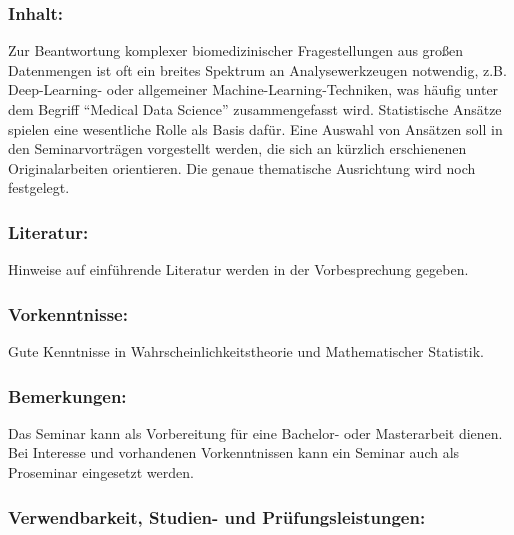 \documentclass[a4paper,10pt]{article}
\begin{document}
\subsubsection*{\large
    Inhalt:
}
Zur Beantwortung komplexer biomedizinischer Fragestellungen aus großen Datenmengen ist oft ein breites Spektrum an Analysewerkzeugen notwendig, z.B. Deep-Learning- oder allgemeiner Machine-Learning-Techniken, was häufig unter dem Begriff "`Medical Data Science"' zusammengefasst wird. Statistische Ansätze spielen eine wesentliche Rolle als Basis dafür. Eine Auswahl von Ansätzen soll in den Seminarvorträgen vorgestellt werden, die sich an kürzlich erschienenen Originalarbeiten orientieren. Die genaue thematische Ausrichtung wird noch festgelegt.
\subsubsection*{\large
    Literatur:
}
Hinweise auf einführende Literatur werden in der Vorbesprechung gegeben.
\subsubsection*{\large
    Vorkenntnisse:
}
Gute Kenntnisse in Wahrscheinlichkeitstheorie und Mathematischer Statistik.
\subsubsection*{\large
    Bemerkungen:
}
Das Seminar kann als Vorbereitung für eine Bachelor- oder Masterarbeit dienen.\\
Bei Interesse und vorhandenen Vorkenntnissen kann ein Seminar auch als Proseminar eingesetzt werden.
\subsubsection*{\large
    Verwendbarkeit, Studien- und Prüfungsleistungen:
}
\end{document}
